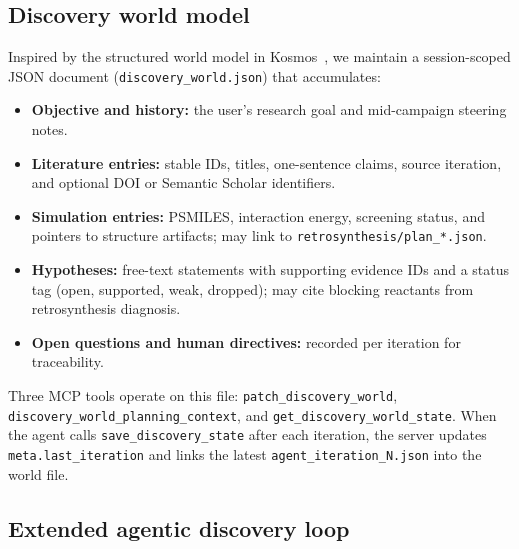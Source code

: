 \documentclass[twocolumn]{fairmeta}
\begin{document}
\subsection{Discovery world model}

Inspired by the structured world model in Kosmos~\cite{kosmos2025}, we maintain a session-scoped JSON document (\texttt{discovery\_world.json}) that accumulates:
\begin{itemize}
\item \textbf{Objective and history:} the user's research goal and mid-campaign steering notes.
\item \textbf{Literature entries:} stable IDs, titles, one-sentence claims, source iteration, and optional DOI or Semantic Scholar identifiers.
\item \textbf{Simulation entries:} PSMILES, interaction energy, screening status, and pointers to structure artifacts; may link to \texttt{retrosynthesis/plan\_*.json}.
\item \textbf{Hypotheses:} free-text statements with supporting evidence IDs and a status tag (open, supported, weak, dropped); may cite blocking reactants from retrosynthesis diagnosis.
\item \textbf{Open questions and human directives:} recorded per iteration for traceability.
\end{itemize}
Three MCP tools operate on this file: \texttt{patch\_discovery\_world}, \texttt{discovery\_world\_planning\_context}, and \texttt{get\_discovery\_world\_state}.
When the agent calls \texttt{save\_discovery\_state} after each iteration, the server updates \texttt{meta.last\_iteration} and links the latest \texttt{agent\_iteration\_N.json} into the world file.

\subsection{Extended agentic discovery loop}
\label{sec:loop}
\end{document}
